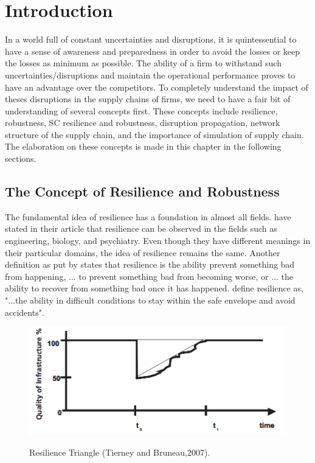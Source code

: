 \chapter{Introduction} \label{ch:introduction}
 In a world full of constant uncertainties and disruptions, it is quintessential to have a sense of awareness and preparedness in order to avoid the losses or keep the losses as minimum as possible. The ability of a firm to withstand such uncertainties/disruptions and maintain the operational performance proves to have an advantage over the competitors. To completely understand the impact of theses disruptions in the supply chains of firms, we need to have a fair bit of understanding of several concepts first. These concepts include resilience, robustness, SC resilience and robustness, disruption propagation, network structure of the supply chain, and the importance of simulation of supply chain. The elaboration on these concepts is made in this chapter in the following sections.


\section{The Concept of Resilience and Robustness}
The fundamental idea of resilience has a foundation in almost all fields. \citep{Boin2010} have stated in their article that resilience can be observed in the fields such as engineering, biology, and psychiatry. Even though they have different meanings in their particular domains, the idea of resilience remains the same. Another definition as put by \citep{Westrum2006} states that resilience is the ability prevent something bad from happening, ... to prevent something bad from becoming worse, or ... the ability to recover from something bad once it has happened.  \citep{HaleA.&Heijer2006} define resilience as, "...the ability in difficult conditions to stay within the safe envelope and avoid accidents". 

\begin{figure}
  \centering
  \includegraphics[width=6.5in]{figures/pdf/Resiliency-Triangle.jpg}\\
  \caption{Resilience Triangle (Tierney and Bruneau,2007).}\label{Resilience Triangle}
\end{figure}


